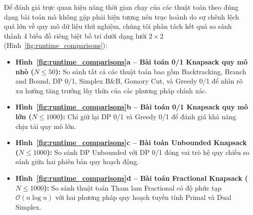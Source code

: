 \documentclass[fontsize=13pt,a4paper]{report}
\begin{document}
Để đánh giá trực quan hiệu năng thời gian chạy của các thuật toán theo đúng dạng bài toán mà không gặp phải hiện tượng nén trục hoành do sự chênh lệch quá lớn về quy mô dữ liệu thử nghiệm, chúng tôi phân tách kết quả so sánh thành 4 biểu đồ riêng biệt bố trí dưới dạng lưới $2 \times 2$ (Hình~\ref{fig:runtime_comparisons}):
\begin{itemize}[leftmargin=*]
    \item \textbf{Hình~\ref{fig:runtime_comparisons}a -- Bài toán 0/1 Knapsack quy mô nhỏ ($N \le 50$):} So sánh tất cả các thuật toán bao gồm Backtracking, Branch and Bound, DP 0/1, Simplex B\&B, Gomory Cut, và Greedy 0/1 để nhìn rõ xu hướng tăng trưởng lũy thừa của các phương pháp chính xác.
    \item \textbf{Hình~\ref{fig:runtime_comparisons}b -- Bài toán 0/1 Knapsack quy mô lớn ($N \le 1000$):} Chỉ giữ lại DP 0/1 và Greedy 0/1 để đánh giá khả năng chịu tải quy mô lớn.
    \item \textbf{Hình~\ref{fig:runtime_comparisons}c -- Bài toán Unbounded Knapsack ($N \le 1000$):} So sánh DP Unbounded với DP 0/1 đóng vai trò hệ quy chiếu so sánh giữa hai phiên bản quy hoạch động.
    \item \textbf{Hình~\ref{fig:runtime_comparisons}d -- Bài toán Fractional Knapsack ($N \le 1000$):} So sánh thuật toán Tham lam Fractional có độ phức tạp $\mathcal{O}(n \log n)$ với hai phương pháp quy hoạch tuyến tính Primal và Dual Simplex.
\end{itemize}
\end{document}
